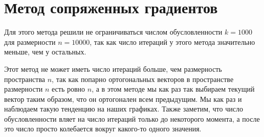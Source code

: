\newpage
\section{Метод сопряженных градиентов}

Для этого метода решили не ограничиваться числом обусловленности \newline $k = 1000$ для размерности $n = 10000$,
так как число итераций у этого метода значительно меньше, чем у остальных.

Этот метод не может иметь число итераций больше, чем размерность пространства $n$, так как попарно ортогональных
векторов в пространстве размерности $n$ есть ровно $n$, а в этом методе мы как раз так выбираем текущий вектор таким
образом, что он ортогонален всем предыдущим. Мы как раз и наблюдаем такую тенденцию на наших графиках.
Также заметим, что число обусловленности вляет на число итераций только до некоторого момента, а после это 
число просто колебается вокруг какого-то одного значения.

\begin{flushleft}
\end{flushleft}


\begin{flushleft}
\end{flushleft}

